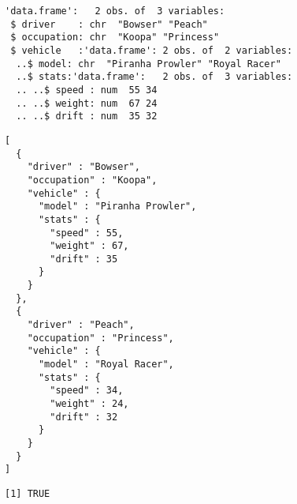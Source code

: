 \begin{knitrout}\mycodesize
{}\color{fgcolor}\begin{kframe}
\begin{alltt}
\hlstd{(}\hlstd{=}\hlstd{)}
 \hlkwb{<-} \hlstd{(} \hlstd{=} \hlstd{(}\hlstd{,} \hlstd{),} 
   \hlstd{=} \hlstd{(}\hlstd{,} \hlstd{))}
\hlopt{$} \hlkwb{<-} \hlstd{(} \hlstd{=} \hlstd{(}\hlstd{,} \hlstd{))}
\hlopt{$}\hlopt{$} \hlkwb{<-} \hlstd{(} \hlstd{=} \hlstd{(}\hlstd{,} \hlstd{),}  \hlstd{=} \hlstd{(}\hlstd{,} \hlstd{),} 
   \hlstd{=} \hlstd{(}\hlstd{,} \hlstd{))}
\end{alltt}
\begin{verbatim}
'data.frame':	2 obs. of  3 variables:
 $ driver    : chr  "Bowser" "Peach"
 $ occupation: chr  "Koopa" "Princess"
 $ vehicle   :'data.frame':	2 obs. of  2 variables:
  ..$ model: chr  "Piranha Prowler" "Royal Racer"
  ..$ stats:'data.frame':	2 obs. of  3 variables:
  .. ..$ speed : num  55 34
  .. ..$ weight: num  67 24
  .. ..$ drift : num  35 32
\end{verbatim}
\begin{alltt}
\hlstd{(} \hlstd{=}\hlstd{))}
\end{alltt}
\begin{verbatim}
[
  {
    "driver" : "Bowser",
    "occupation" : "Koopa",
    "vehicle" : {
      "model" : "Piranha Prowler",
      "stats" : {
        "speed" : 55,
        "weight" : 67,
        "drift" : 35
      }
    }
  },
  {
    "driver" : "Peach",
    "occupation" : "Princess",
    "vehicle" : {
      "model" : "Royal Racer",
      "stats" : {
        "speed" : 34,
        "weight" : 24,
        "drift" : 32
      }
    }
  }
]
\end{verbatim}
\begin{alltt}
 \hlkwb{<-} 
 \hlkwb{<-} 
\end{alltt}
\begin{verbatim}
[1] TRUE
\end{verbatim}
\end{kframe}
\end{knitrout}


